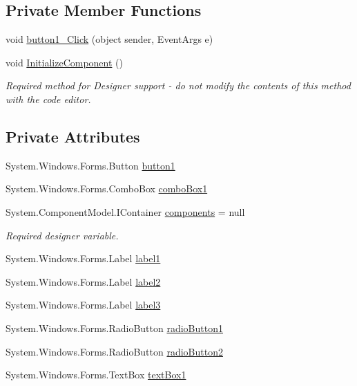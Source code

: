 \subsection*{Private Member Functions}
\begin{DoxyCompactItemize}
\item 
void \hyperlink{class__7___doroshenko__forms2__is52_1_1_estimate_a34445933242ab461b53690eaa9f294df}{button1\+\_\+\+Click} (object sender, Event\+Args e)
\item 
void \hyperlink{class__7___doroshenko__forms2__is52_1_1_estimate_aeedb1a70eec0fed7344014a1fe63c5f2}{Initialize\+Component} ()
\begin{DoxyCompactList}\small\item\em Required method for Designer support -\/ do not modify the contents of this method with the code editor. \end{DoxyCompactList}\end{DoxyCompactItemize}
\subsection*{Private Attributes}
\begin{DoxyCompactItemize}
\item 
System.\+Windows.\+Forms.\+Button \hyperlink{class__7___doroshenko__forms2__is52_1_1_estimate_af649b07d4cf02ec0a9844459f73aa5a6}{button1}
\item 
System.\+Windows.\+Forms.\+Combo\+Box \hyperlink{class__7___doroshenko__forms2__is52_1_1_estimate_a640a62b52ff84754e7a739382a55698b}{combo\+Box1}
\item 
System.\+Component\+Model.\+I\+Container \hyperlink{class__7___doroshenko__forms2__is52_1_1_estimate_a3d597c6c8558b9dc490f1d86e7d3d26c}{components} = null
\begin{DoxyCompactList}\small\item\em Required designer variable. \end{DoxyCompactList}\item 
System.\+Windows.\+Forms.\+Label \hyperlink{class__7___doroshenko__forms2__is52_1_1_estimate_afbe584ac7045dc9e1a19dc64d998a1d7}{label1}
\item 
System.\+Windows.\+Forms.\+Label \hyperlink{class__7___doroshenko__forms2__is52_1_1_estimate_a61c54a319789d95a13c6b2c482bd3469}{label2}
\item 
System.\+Windows.\+Forms.\+Label \hyperlink{class__7___doroshenko__forms2__is52_1_1_estimate_aa4b3864be172684094a2988786b3f404}{label3}
\item 
System.\+Windows.\+Forms.\+Radio\+Button \hyperlink{class__7___doroshenko__forms2__is52_1_1_estimate_ae9e5c0a7c68481d6cc23c3940e92ac1e}{radio\+Button1}
\item 
System.\+Windows.\+Forms.\+Radio\+Button \hyperlink{class__7___doroshenko__forms2__is52_1_1_estimate_a346c3da7b877695f2c9224118828a7c4}{radio\+Button2}
\item 
System.\+Windows.\+Forms.\+Text\+Box \hyperlink{class__7___doroshenko__forms2__is52_1_1_estimate_a2628ab6124cfa5847df3f5c6e110e16a}{text\+Box1}
\end{DoxyCompactItemize}


